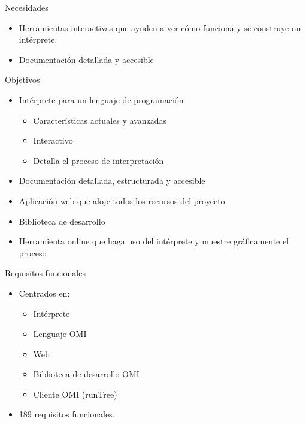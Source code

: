 \documentclass[spanish]{beamer}
\begin{document}
\begin{frame}{Necesidades}
    \begin{itemize}
      \item Herramientas interactivas que ayuden a ver cómo funciona y se construye un intérprete. 
      \item Documentación detallada y accesible 
   \end{itemize}
\end{frame}

\begin{frame}{Objetivos}
    \begin{itemize}
      \item Intérprete para un lenguaje de programación
      \begin{itemize}
         \item Características actuales y avanzadas
         \item Interactivo
         \item Detalla el proceso de interpretación
      \end{itemize}
      \item Documentación detallada, estructurada y accesible
      \item Aplicación web que aloje todos los recursos del proyecto
      \item Biblioteca de desarrollo
      \item Herramienta online que haga uso del intérprete y muestre gráficamente el proceso
   \end{itemize}
\end{frame}

\begin{frame}{Requisitos funcionales}
    \begin{itemize}
      \item Centrados en:
      \begin{itemize}
         \item Intérprete
         \item Lenguaje OMI
         \item Web
         \item Biblioteca de desarrollo OMI
         \item Cliente OMI (runTree)
      \end{itemize}
      \item 189 requisitos funcionales.
   \end{itemize}
\end{frame}
\end{document}
